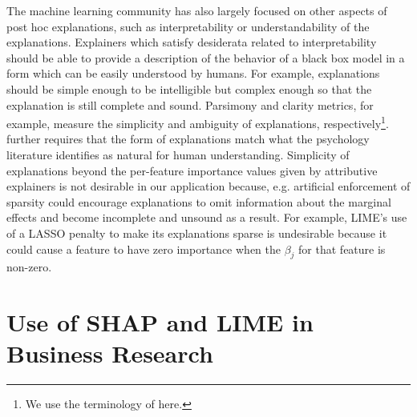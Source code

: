 \documentclass[mnsc,blindrev]{informs3}
\begin{document}
  The machine learning community has also largely focused on other aspects of post hoc explanations, such as interpretability or understandability of the explanations.   Explainers which satisfy desiderata related to  interpretability should be able to provide a description of the behavior of a black box model in a form which can be easily understood by humans. For example, explanations should be simple enough to be intelligible but complex enough so that the explanation is still complete and sound. Parsimony \citep{nguyen2020quantitative} and clarity \citep{lakkaraju2017interpretable,montavon2018methods,alvarez18robustness} metrics, for example, measure the simplicity and ambiguity of explanations, respectively\footnote{We use the terminology of \cite{markus2021role} here.}. \cite{jacovi2023diagnosing} further requires that the form of explanations match what the psychology literature identifies as natural for human understanding.  Simplicity of explanations beyond the per-feature importance values given by attributive explainers is not desirable in our application because, e.g. artificial enforcement of sparsity could encourage explanations to omit information about the marginal effects and become incomplete and unsound as a result. For example, LIME's use of a LASSO penalty to make its explanations sparse is undesirable because it could cause a feature to have zero importance when the $\beta_j$ for that feature is non-zero. %

    
   
    \section{Use of SHAP and LIME in Business Research}
\end{document}
